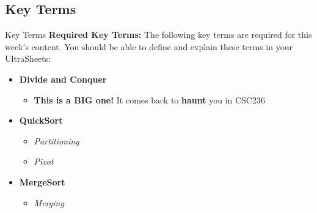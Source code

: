 \documentclass[hyperref={colorlinks,citecolor=blue,linkcolor=blue,urlcolor=blue}, aspectratio=1610]{beamer}
\begin{document}
\subsection{Key Terms}
\begin{frame}{Key Terms}
  \textbf{Required Key Terms:} The following key terms are required for this week's content. You should be able to define and explain these terms in your UltraSheets\texttrademark{}:
  \begin{itemize}
    \item \textbf{Divide and Conquer} 
    \begin{itemize}
        \pause
        \item \textbf{This is a BIG one!} It comes back to \textbf{haunt} you in CSC236
    \end{itemize}
    \pause
    \item \textbf{QuickSort}
    \begin{itemize}
        \pause
        \item \textit{Partitioning}
        \pause
        \item \textit{Pivot}
    \end{itemize}
    \pause
    \item \textbf{MergeSort}
    \begin{itemize}
      \pause
      \item \textit{Merging}
    \end{itemize}
  \end{itemize}
\end{frame}
\end{document}
